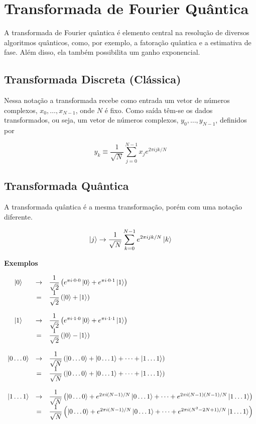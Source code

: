 \section{Transformada de Fourier Quântica}\label{sec:transformada-de-fourier-quantica}

A transformada de Fourier quântica é elemento central na resolução de
diversos algoritmos quânticos, como, por exemplo, a fatoração quântica e
a estimativa de fase.
Além disso, ela também possibilita um ganho exponencial.

\subsection{Transformada Discreta (Clássica)}\label{subsec:transformada-discreta}

Nessa notação a transformada recebe como entrada um vetor de números
complexos, \(x_0, \dots, x_{N - 1}\), onde \(N\) é fixo.
Como saída têm-se os dados transformados, ou seja, um vetor de números complexos,
\(y_0, \dots, y_{N - 1}\), definidos por

\[
    y_k \equiv \dfrac{1}{\sqrt{N}} \sum_{j=0}^{N-1} x_j e^{2\pi i jk / N}
\]

\subsection{Transformada Quântica}\label{subsec:transformada-quantica}

A transformada quântica é a mesma transformação, porém com uma notação diferente.

\[
    \ket{j} \to \dfrac{1}{\sqrt{N}} \sum_{k=0}^{N-1} e^{2 \pi  i jk /N} \ket{k}
\]

\textbf{Exemplos}

\[
    \begin{array}{ccl}
        \ket{0} &\to& \dfrac{1}{\sqrt{2}} \left( e^{\pi i\cdot 0\cdot 0} \ket{0} + e^{\pi i\cdot 0\cdot 1} \ket{1}\right) \\
        &=& \dfrac{1}{\sqrt{2}} \left( \ket{0} + \ket{1}\right) \\ \\
        \ket{1} &\to& \dfrac{1}{\sqrt{2}} \left( e^{\pi i\cdot 1\cdot 0} \ket{0} + e^{\pi i\cdot 1\cdot 1} \ket{1}\right) \\
        &=& \dfrac{1}{\sqrt{2}} \left( \ket{0} - \ket{1}\right) \\ \\
        \ket{0 \dots 0} &\to& \dfrac{1}{\sqrt{N}} \left( \ket{0 \dots 0} +  \ket{0 \dots 1} + \dots + \ket{1 \dots 1}\right) \\
        &=& \dfrac{1}{\sqrt{N}} \left( \ket{0 \dots 0} + \ket{0 \dots 1} + \dots + \ket{1 \dots 1} \right) \\ \\
        \ket{1 \dots 1} &\to& \dfrac{1}{\sqrt{N}} \left( \ket{0 \dots 0} + e^{2\pi i(N-1)/N} \ket{0 \dots 1} + \dots + e^{2\pi i(N-1)(N-1)/N} \ket{1 \dots 1}\right) \\
        &=& \dfrac{1}{\sqrt{N}} \left( \ket{0 \dots 0} + e^{2\pi i(N-1)/N} \ket{0 \dots 1} + \dots + e^{2\pi i(N^2-2N+1)/N} \ket{1 \dots 1} \right)
    \end{array}
\]

